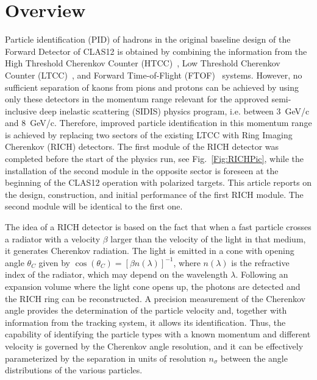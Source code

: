 \documentclass[5p,times,twocolumn]{elsarticle}
\begin{document}
\section{Overview}

Particle identification (PID) of hadrons in the original baseline design of the Forward Detector of CLAS12 is obtained
by combining the information from the High Threshold Cherenkov Counter (HTCC)~\cite{REF:htcc-nim}, Low Threshold
Cherenkov Counter (LTCC)~\cite{REF:ltcc-nim}, and Forward Time-of-Flight (FTOF)~\cite{REF:ftof-nim} systems. However,
no sufficient separation of kaons from pions and protons can be achieved by using only these detectors in the
momentum range relevant for the approved semi-inclusive deep inelastic scattering (SIDIS) physics program,
i.e. between 3~GeV/c and 8~GeV/c. Therefore, improved particle identification in this momentum range is achieved by
replacing two sectors of the existing LTCC with Ring Imaging Cherenkov (RICH) detectors. The first module of the
RICH detector was completed before the start of the physics run, see Fig.~\ref{Fig:RICHPic}, while the installation
of the second module in the opposite sector is foreseen at the beginning of the CLAS12 operation with polarized
targets. This article reports on the design, construction, and initial performance of the first RICH module. The second
module will be identical to the first one.

The idea of a RICH detector is based on the fact that when a fast particle crosses a radiator with a velocity $\beta$
larger than the velocity of the light in that medium, it generates Cherenkov radiation. The light is emitted in a cone with
opening angle $\theta_C$ given by $\cos(\theta_C)=[\beta n(\lambda)]^{-1}$, where $n(\lambda)$ is the refractive index
of the radiator, which may depend on the wavelength $\lambda$. 
Following an expansion volume where the light cone opens up, the
photons are detected and the RICH ring can be reconstructed. A precision measurement of the Cherenkov angle provides
the determination of the particle velocity and, together with information from the tracking system, it allows its identification. Thus,
the capability of identifying the particle types with a known momentum and different velocity is governed by the Cherenkov angle
resolution, and it can be effectively parameterized by the separation in units of resolution $n_{\sigma}$ between the
angle distributions of the various particles.
\end{document}
